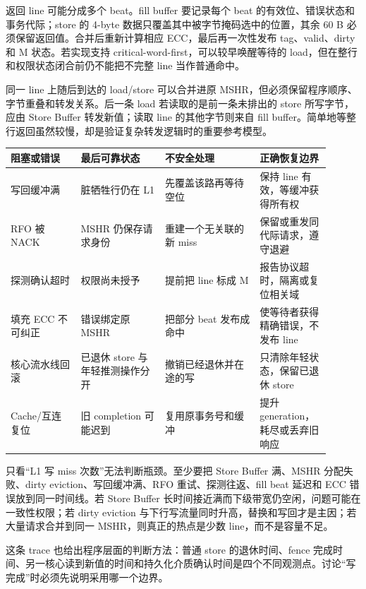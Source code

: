
返回 line 可能分成多个 beat。fill buffer 要记录每个 beat 的有效位、错误状态和事务代际；store 的 4-byte 数据只覆盖其中被字节掩码选中的位置，其余 60 B 必须保留返回值。合并后重新计算相应 ECC，最后再一次性发布 tag、valid、dirty 和 M 状态。若实现支持 critical-word-first，可以较早唤醒等待的 load，但在整行和权限状态闭合前仍不能把不完整 line 当作普通命中。

同一 line 上随后到达的 load/store 可以合并进原 MSHR，但必须保留程序顺序、字节重叠和转发关系。后一条 load 若读取的是前一条未排出的 store 所写字节，应由 Store Buffer 转发新值；读取 line 的其他字节则来自 fill buffer。简单地等整行返回虽然较慢，却是验证复杂转发逻辑时的重要参考模型。

\begin{longtable}{L{0.2\linewidth}L{0.24\linewidth}L{0.27\linewidth}L{0.19\linewidth}}
\toprule
阻塞或错误 & 最后可靠状态 & 不安全处理 & 正确恢复边界 \\
\midrule
写回缓冲满 & 脏牺牲行仍在 L1 & 先覆盖该路再等待空位 & 保持 line 有效，等缓冲获得所有权 \\\tablerowrule
RFO 被 NACK & MSHR 仍保存请求身份 & 重建一个无关联的新 miss & 保留或重发同代际请求，遵守退避 \\\tablerowrule
探测确认超时 & 权限尚未授予 & 提前把 line 标成 M & 报告协议超时，隔离或复位相关域 \\\tablerowrule
填充 ECC 不可纠正 & 错误绑定原 MSHR & 把部分 beat 发布成命中 & 使等待者获得精确错误，不发布 line \\\tablerowrule
核心流水线回滚 & 已退休 store 与年轻推测操作分开 & 撤销已经退休并在途的写 & 只清除年轻状态，保留已退休 store \\\tablerowrule
Cache/互连复位 & 旧 completion 可能迟到 & 复用原事务号和缓冲 & 提升 generation，耗尽或丢弃旧响应 \\
\bottomrule
\end{longtable}


只看“L1 写 miss 次数”无法判断瓶颈。至少要把 Store Buffer 满、MSHR 分配失败、dirty eviction、写回缓冲满、RFO 重试、探测往返、fill beat 延迟和 ECC 错误放到同一时间线。若 Store Buffer 长时间接近满而下级带宽仍空闲，问题可能在一致性权限；若 dirty eviction 与下行写流量同时升高，替换和写回才是主因；若大量请求合并到同一 MSHR，则真正的热点是少数 line，而不是容量不足。

这条 trace 也给出程序层面的判断方法：普通 store 的退休时间、fence 完成时间、另一核心读到新值的时间和持久化介质确认时间是四个不同观测点。讨论“写完成”时必须先说明采用哪一个边界。

